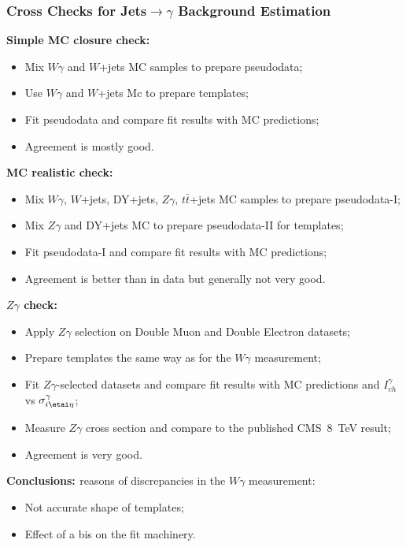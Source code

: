\begin{frame}\frametitle {Cross Checks for Jets$\rightarrow\gamma$ Background Estimation}

\footnotesize{\bfseries{Simple MC closure check:}}
\tiny
\begin{itemize}
  \item Mix $W\gamma$ and $W$+jets MC samples to prepare pseudodata;
  \item Use $W\gamma$ and $W$+jets Mc to prepare templates;
  \item Fit pseudodata and compare fit results with MC predictions;
  \item Agreement is mostly good.
\end{itemize}

\footnotesize{\bfseries{MC realistic check:}}
\tiny
\begin{itemize}
  \item Mix $W\gamma$, $W$+jets, DY+jets, $Z\gamma$, $t\bar{t}$+jets MC samples to prepare pseudodata-I;
  \item Mix $Z\gamma$ and DY+jets MC to prepare pseudodata-II for templates;
  \item Fit pseudodata-I and compare fit results with MC predictions;
  \item Agreement is better than in data but generally not very good.
\end{itemize}

\footnotesize{\bfseries{$Z\gamma$ check:}}
\tiny
\begin{itemize}
  \item Apply $Z\gamma$ selection on Double Muon and Double Electron datasets;
  \item Prepare templates the same way as for the $W\gamma$ measurement;
  \item Fit $Z\gamma$-selected datasets and compare fit results with MC predictions and $I_{ch}^{\gamma}$ vs $\sigma_{i\etai\eta}^{\gamma}$;
  \item Measure $Z\gamma$ cross section and compare to the published CMS~8~TeV result;
  \item Agreement is very good.
\end{itemize}

\footnotesize{\bfseries{Conclusions: }}\scriptsize{reasons of discrepancies in the $W\gamma$ measurement:  }
\scriptsize
\begin{itemize}
  \item Not accurate shape of templates; 
  \item Effect of a bis on the fit machinery.
\end{itemize}

\end{frame}%
